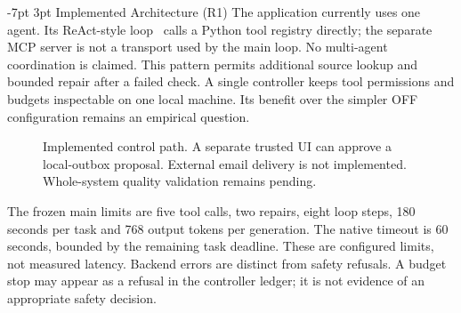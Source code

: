 \documentclass[a4paper,11pt]{article}
\makeatletter
\renewcommand\section{\@startsection{section}{1}{\z@}%
                                   {-7pt \@plus -1pt \@minus -1pt}%
                                   {3pt \@plus 1pt \@minus 1pt}%
                                   {\normalfont\large\bfseries}}
\makeatother
\begin{document}
\section{Implemented Architecture (R1)}
The application currently uses one agent. Its ReAct-style loop~\citep{yao2023react} calls a Python tool registry directly; the separate MCP server is not a transport used by the main loop. No multi-agent coordination is claimed.
This pattern permits additional source lookup and bounded repair after a failed check. A single controller keeps tool permissions and budgets inspectable on one local machine. Its benefit over the simpler OFF configuration remains an empirical question.
\begin{figure}[H]\centering
{}
\caption{Implemented control path. A separate trusted UI can approve a local-outbox proposal. External email delivery is not implemented. Whole-system quality validation remains pending.}
\end{figure}
The frozen main limits are five tool calls, two repairs, eight loop steps, 180 seconds per task and 768 output tokens per generation. The native timeout is 60 seconds, bounded by the remaining task deadline. These are configured limits, not measured latency. Backend errors are distinct from safety refusals. A budget stop may appear as a refusal in the controller ledger; it is not evidence of an appropriate safety decision.
\end{document}
